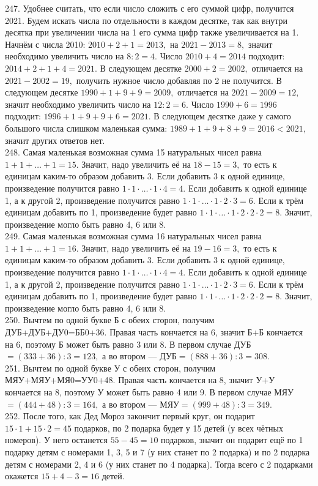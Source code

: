 247. Удобнее считать, что если число сложить с его суммой цифр, получится 2021. Будем искать числа по отдельности в каждом десятке, так как внутри десятка при увеличении числа на 1 его сумма цифр также увеличивается на 1. Начнём с числа 2010: $2010+2+1=2013,$ на $2021-2013=8,$ значит необходимо увеличить число на $8:2=4.$ Число $2010+4=2014$ подходит: $2014+2+1+4=2021.$ В следующем десятке $2000+2=2002,$ отличается на $2021-2002=19,$ получить нужное число добавляя по 2 не получится. В следующем десятке $1990+1+9+9=2009,$ отличается на $2021-2009=12,$ значит необходимо увеличить число на $12:2=6.$ Число $1990+6=1996$ подходит: $1996+1+9+9+6=2021.$ В следующем десятке даже у самого большого числа слишком маленькая сумма: $1989+1+9+8+9=2016<2021,$ значит других ответов нет.\\
248. Самая маленькая возможная сумма 15 натуральных чисел равна $1+1+\ldots+1=15.$ Значит, надо увеличить её на $18-15=3,$ то есть к единицам каким-то образом добавить 3. Если добавить 3 к одной единице, произведение получится равно $1\cdot1\cdot\ldots\cdot1\cdot4=4.$ Если добавить к одной единице 1, а к другой 2, произведение получится равно $1\cdot1\cdot\ldots\cdot1\cdot2\cdot3=6.$ Если к трём единицам добавить по 1, произведение будет равно $1\cdot1\cdot\ldots\cdot1\cdot2\cdot2\cdot2=8.$ Значит, произведение могло быть равно 4, 6 или 8.\\
249. Самая маленькая возможная сумма 16 натуральных чисел равна $1+1+\ldots+1=16.$ Значит, надо увеличить её на $19-16=3,$ то есть к единицам каким-то образом добавить 3. Если добавить 3 к одной единице, произведение получится равно $1\cdot1\cdot\ldots\cdot1\cdot4=4.$ Если добавить к одной единице 1, а к другой 2, произведение получится равно $1\cdot1\cdot\ldots\cdot1\cdot2\cdot3=6.$ Если к трём единицам добавить по 1, произведение будет равно $1\cdot1\cdot\ldots\cdot1\cdot2\cdot2\cdot2=8.$ Значит, произведение могло быть равно 4, 6 или 8.\\
250. Вычтем по одной букве Б с обеих сторон, получим ДУБ+ДУБ+ДУ0=ББ0+36. Правая часть кончается на 6, значит Б+Б кончается на 6, поэтому Б может быть равно 3 или 8. В первом случае ДУБ$=(333+36):3=123,$ а во втором --- ДУБ$=(888+36):3=308.$\\
251. Вычтем по одной букве У с обеих сторон, получим МЯУ+МЯУ+МЯ0=УУ0+48. Правая часть кончается на 8, значит У+У кончается на 8, поэтому У может быть равно 4 или 9. В первом случае МЯУ$=(444+48):3=164,$ а во втором --- МЯУ$=(999+48):3=349.$\\
252. После того, как Дед Мороз закончит первый круг, он подарит $15\cdot1+15\cdot2=45$ подарков, по 2 подарка будет у 15 детей (у всех чётных номеров). У него останется $55-45=10$ подарков, значит он подарит ещё по 1 подарку детям с номерами 1, 3, 5 и 7 (у них станет по 2 подарка) и по 2 подарка детям с номерами 2, 4 и 6 (у них станет по 4 подарка). Тогда всего с 2 подарками окажется $15+4-3=16$ детей.\\
